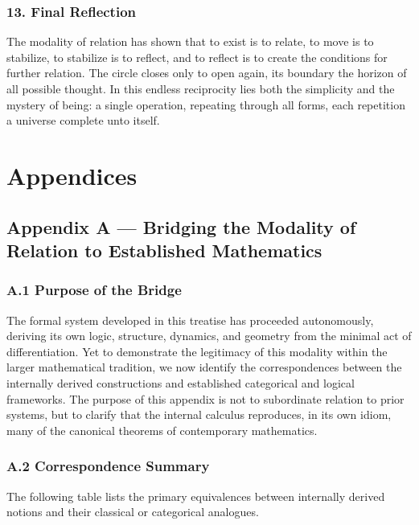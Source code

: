 \documentclass[11pt]{article}
\begin{document}
\subsubsection*{13. Final Reflection}
\label{sec:orgf554f23}
The modality of relation has shown that to exist is to relate,  
to move is to stabilize, to stabilize is to reflect,  
and to reflect is to create the conditions for further relation.  
The circle closes only to open again,  
its boundary the horizon of all possible thought.  
In this endless reciprocity lies both the simplicity and the mystery of being:  
a single operation, repeating through all forms,  
each repetition a universe complete unto itself.
\section*{Appendices}
\label{sec:org31f1bb9}
\subsection*{Appendix A — Bridging the Modality of Relation to Established Mathematics}
\label{sec:org4acbf14}

\subsubsection*{A.1 Purpose of the Bridge}
\label{sec:org9c3cf8c}
The formal system developed in this treatise has proceeded autonomously,  
deriving its own logic, structure, dynamics, and geometry from the minimal act of differentiation.  
Yet to demonstrate the legitimacy of this modality within the larger mathematical tradition,  
we now identify the correspondences between the internally derived constructions  
and established categorical and logical frameworks.  
The purpose of this appendix is not to subordinate relation to prior systems,  
but to clarify that the internal calculus reproduces, in its own idiom,  
many of the canonical theorems of contemporary mathematics.
\subsubsection*{A.2 Correspondence Summary}
\label{sec:org3086f74}
The following table lists the primary equivalences between internally derived notions  
and their classical or categorical analogues.
\end{document}

